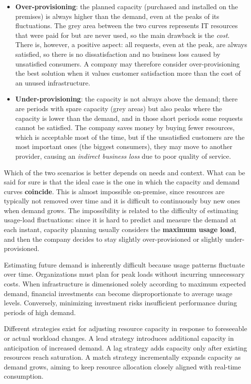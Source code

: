 \documentclass[11pt,a4paper,openany]{report}
\begin{document}
\begin{itemize}
	\item \textbf{Over-provisioning}: the planned capacity (purchased and installed on the premises) is always higher than the demand, even at the peaks of its fluctuations. The grey area between the two curves represents IT resources that were paid for but are never used, so the main drawback is the \emph{cost}. There is, however, a positive aspect: all requests, even at the peak, are always satisfied, so there is no dissatisfaction and no business loss caused by unsatisfied consumers. A company may therefore consider over-provisioning the best solution when it values customer satisfaction more than the cost of an unused infrastructure.
	\item \textbf{Under-provisioning}: the capacity is not always above the demand; there are periods with spare capacity (grey areas) but also peaks where the capacity is lower than the demand, and in those short periods some requests cannot be satisfied. The company saves money by buying fewer resources, which is acceptable most of the time, but if the unsatisfied customers are the most important ones (the biggest consumers), they may move to another provider, causing an \emph{indirect business loss} due to poor quality of service.
\end{itemize}

Which of the two scenarios is better depends on needs and context. What can be said for sure is that the ideal case is the one in which the capacity and demand curves \textbf{coincide}. This is almost impossible on-premise, since resources are typically not removed over time and it is difficult to continuously buy new ones when demand grows. The impossibility is related to the difficulty of estimating usage-load fluctuations: since it is hard to predict and measure the demand at each instant, capacity planning usually considers the \textbf{maximum usage load}, and then the company decides to stay slightly over-provisioned or slightly under-provisioned.

Estimating future demand is inherently difficult because usage patterns fluctuate over time. Organizations must plan for peak loads without incurring unnecessary costs. When infrastructure is dimensioned solely according to maximum expected demand, financial investments can become disproportionate to average usage levels. Conversely, minimizing investment risks insufficient performance during periods of high demand.

Different strategies exist for adjusting resource capacity in response to foreseeable or actual workload changes. A lead strategy introduces additional capacity in anticipation of increased demand. A lag strategy adds capacity only after existing resources reach saturation. A match strategy incrementally expands capacity as demand grows, aiming to keep resource allocation closely aligned with real-time consumption.
\end{document}
